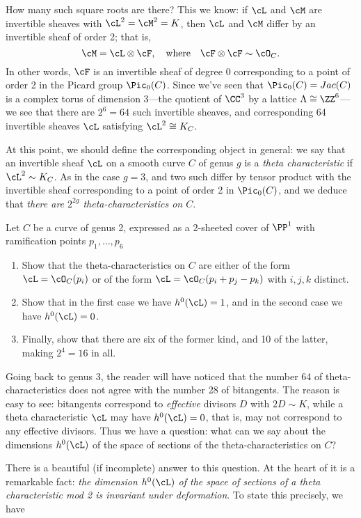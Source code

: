How many such square roots are there? This we know: if $\cL$ and $\cM$ are invertible sheaves with $\cL^2 = \cM^2 = K$, then $\cL$ and $\cM$ differ by an invertible sheaf of order 2; that is,
$$
\cM = \cL \otimes \cF, \quad \text{where} \quad \cF \otimes \cF \sim \cO_C.
$$
In other words, $\cF$ is an invertible sheaf of degree 0 corresponding to a point of order 2 in the Picard group $\Pic_0(C)$. Since we've seen that $\Pic_0(C) = Jac(C)$ is a complex torus of dimension 3---the quotient of $\CC^3$ by a lattice $\Lambda \cong \ZZ^6$---we see that there are $2^6 = 64$ such invertible sheaves, and corresponding 64 invertible sheaves $\cL$ satisfying $\cL^2 \cong K_C$.

At this point, we should define the corresponding object in general: we say that an invertible sheaf $\cL$ on a smooth curve $C$ of genus $g$ is a \emph{theta characteristic} if $\cL^2 \sim K_C$. As in the case $g=3$, and two such differ by tensor product with the
 invertible sheaf corresponding to a point of order 2 in $\Pic_0(C)$, and we deduce that \emph{there are $2^{2g}$ theta-characteristics on $C$}.
 
 \begin{exercise}
 Let $C$ be a curve of genus 2, expressed as a 2-sheeted cover of $\PP^1$ with ramification points $p_1,\dots,p_6$
 \begin{enumerate}
 \item Show that the theta-characteristics on $C$ are either of the form $\cL = \cO_C(p_i)$ or of the form $\cL = \cO_C(p_i + p_j - p_k)$ with $i, j, k$ distinct. 
 \item Show that in the first case we have $h^0(\cL) = 1$, and in the second case we have $h^0(\cL) = 0$. 
 \item Finally, show that there are six of the former kind, and 10 of the latter, making $2^4 = 16$ in all.
 \end{enumerate}
 \end{exercise}
 
 Going back to genus 3, the reader will have noticed that the number 64 of theta-characteristics does not agree with the number 28 of bitangents. The reason is easy to see: bitangents correspond to \emph{effective} divisors $D$ with $2D \sim K$, while a theta characteristic $\cL$ may have $h^0(\cL) = 0$, that is, may not correspond to any effective divisors. Thus we have a question: what can we say about the dimensions $h^0(\cL)$ of the space of sections of the theta-characteristics on $C$?
 
 There is a beautiful (if incomplete) answer to this question. At the heart of it is a remarkable fact: \emph{the dimension $h^0(\cL)$ of the space of sections of a theta characteristic mod 2 is invariant under deformation}. To state this precisely, we have
 
